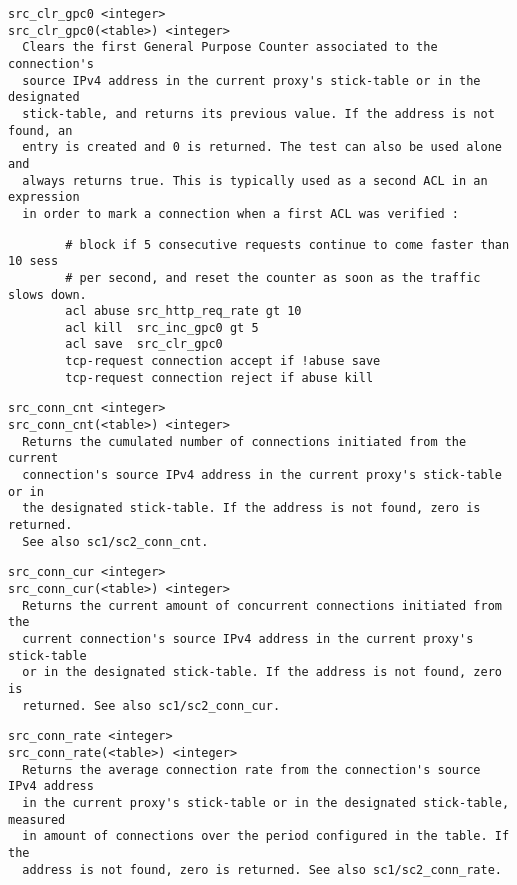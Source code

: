 \begin{verbatim}
src_clr_gpc0 <integer>
src_clr_gpc0(<table>) <integer>
  Clears the first General Purpose Counter associated to the connection's
  source IPv4 address in the current proxy's stick-table or in the designated
  stick-table, and returns its previous value. If the address is not found, an
  entry is created and 0 is returned. The test can also be used alone and
  always returns true. This is typically used as a second ACL in an expression
  in order to mark a connection when a first ACL was verified :
\end{verbatim}

\begin{verbatim}
        # block if 5 consecutive requests continue to come faster than 10 sess
        # per second, and reset the counter as soon as the traffic slows down.
        acl abuse src_http_req_rate gt 10
        acl kill  src_inc_gpc0 gt 5
        acl save  src_clr_gpc0
        tcp-request connection accept if !abuse save
        tcp-request connection reject if abuse kill
\end{verbatim}

\begin{verbatim}
src_conn_cnt <integer>
src_conn_cnt(<table>) <integer>
  Returns the cumulated number of connections initiated from the current
  connection's source IPv4 address in the current proxy's stick-table or in
  the designated stick-table. If the address is not found, zero is returned.
  See also sc1/sc2_conn_cnt.
\end{verbatim}

\begin{verbatim}
src_conn_cur <integer>
src_conn_cur(<table>) <integer>
  Returns the current amount of concurrent connections initiated from the
  current connection's source IPv4 address in the current proxy's stick-table
  or in the designated stick-table. If the address is not found, zero is
  returned. See also sc1/sc2_conn_cur.
\end{verbatim}

\begin{verbatim}
src_conn_rate <integer>
src_conn_rate(<table>) <integer>
  Returns the average connection rate from the connection's source IPv4 address
  in the current proxy's stick-table or in the designated stick-table, measured
  in amount of connections over the period configured in the table. If the
  address is not found, zero is returned. See also sc1/sc2_conn_rate.
\end{verbatim}


